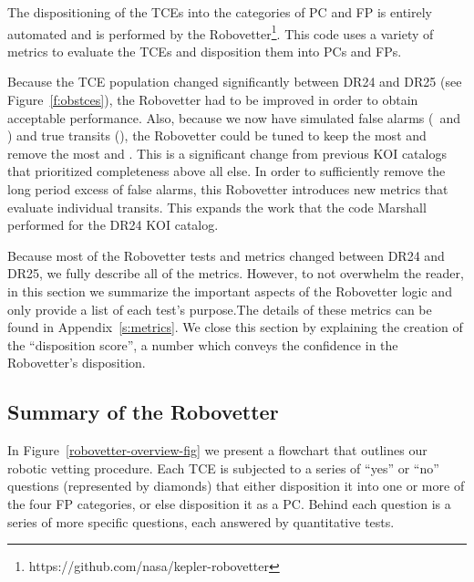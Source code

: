 \label{s:robovetter}
The dispositioning of the TCEs into the categories of PC and FP is entirely automated and is performed by the Robovetter\footnote{https://github.com/nasa/kepler-robovetter}. This code uses a variety of metrics to evaluate the TCEs and disposition them into PCs and FPs.  


Because the TCE population changed significantly between DR24 and DR25 (see Figure~\ref{f:obstces}), the Robovetter had to be improved in order to obtain acceptable performance.  Also, because we now have simulated false alarms (\invtce\ and \scrtce) and true transits (\injtce), the Robovetter could be tuned to keep the most  and remove the most  and . This is a significant change from previous KOI catalogs that prioritized completeness above all else.  In order to sufficiently remove the long period excess of false alarms, this Robovetter introduces new metrics that evaluate individual transits. This expands the work that the code Marshall \citep{Mullally2016} performed for the DR24 KOI catalog.

Because most of the Robovetter tests and metrics changed between DR24 and DR25, we fully describe all of the metrics.  However, to not overwhelm the reader, in this section we summarize the important aspects of the Robovetter logic and only provide a list of each test's purpose.The details of these metrics can be found in Appendix~\ref{s:metrics}. We close this section by explaining the creation of the ``disposition score'', a number which conveys the confidence in the Robovetter's disposition.

\subsection{Summary of the Robovetter}

In Figure~\ref{robovetter-overview-fig} we present a flowchart that outlines our robotic vetting procedure. Each TCE is subjected to a series of ``yes'' or ``no'' questions (represented by diamonds) that either disposition it into one or more of the four FP categories, or else disposition it as a PC. Behind each question is a series of more specific questions, each answered by quantitative tests. 


